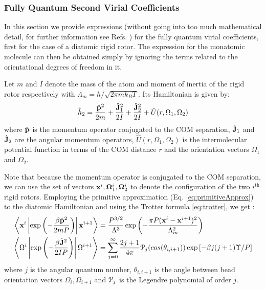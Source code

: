         \subsubsection{Fully Quantum Second Virial Coefficients}
            In this section we provide expressions (without going into too much mathematical detail, for further information see Refs. \cite{Cui1997,Patkowski2008,Garberoglio2009,Garberoglio2014}) for the fully quantum virial coefficients, first for the case of a diatomic rigid rotor. The expression for the monatomic molecule can then be obtained simply by ignoring the terms related to the orientational degrees of freedom in it.

            Let $m$ and $I$ denote the mass of the atom and moment of inertia of the rigid rotor respectively with $\Lambda_m = h/\sqrt{2\pi m k_B T}$. Its Hamiltonian is given by:
            \begin{equation}
            \label{eq:hDiatomic}
                \hat{h}_2 = \displaystyle\frac{\hat{{\mathbf {p}}}^2}{2m} + \frac{\hat{{\mathbf {J}}}_1^2}{2I} + \frac{\hat{{\mathbf {J}}}_2^2}{2I} + \hat{U}(r,\Omega_1,\Omega_2)
            \end{equation}
            where $\hat{{\mathbf {p}}}$ is the momentum operator conjugated to the COM separation, $\hat{{\mathbf {J}}}_1$ and $\hat{{\mathbf {J}}}_2$ are the angular momentum operators, $\hat{U}(r,\Omega_1,\Omega_2)$ is the intermolecular potential function in terms of the COM distance $r$ and the orientation vectors $\Omega_1$ and $\Omega_2$.

            Note that because the momentum operator is conjugated to the COM separation, we can use the set of vectors ${\mathbf {x}}^i,{\mathbf {\Omega}}_1^i, {\mathbf {\Omega}}_2^i$ to denote the configuration of the two $i^\text{th}$ rigid rotors. Employing the primitive approximation (Eq. \eqref{eq:primitiveApprox}) to the diatomic Hamiltonian and using the Trotter formula \ref{eq:trotter}, we get \cite{Cui1997}:
            \begin{equation}
                \begin{aligned}
                    \left< {\mathbf {x}}^i \left| \exp \left(-\displaystyle\frac{\beta \hat{{\mathbf {p}}}^2}{2 m P} \right) \right| {\mathbf {x}}^{i+1} \right> &= \displaystyle\frac{P^{3/2}}{\Lambda^3} \exp \left(-\displaystyle\frac{\pi P ({\mathbf {x}}^i - {\mathbf {x}}^{i+1})^2}{\Lambda_m^2}\right)\\
                    \left< \Omega^i \left| \exp \left(-\displaystyle\frac{\beta \hat{{\mathbf {J}}}^2}{2IP} \right) \right| \Omega^{i+1} \right> &= \displaystyle\sum_{j=0}^\infty \frac{2j+1}{4 \pi} \mathcal{P}_j (cos (\theta_{i,i+1}))\nonumber \exp \left[-\beta j(j+1) \Upsilon/ P \right]
                \end{aligned}
            \end{equation}
            where $j$ is the angular quantum number, $\theta_{i,i+1}$ is the angle between bead orientation vectors $\Omega_i, \Omega_{i+1}$ and $\mathcal{P}_j$ is the Legendre polynomial of order $j$.

